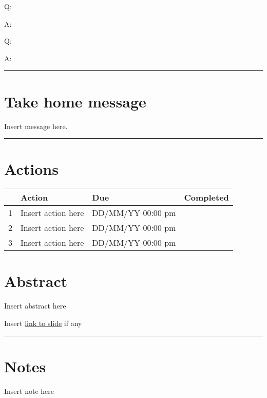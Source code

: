 \documentclass[
]{book}
\begin{document}
Q:

A:

Q:

A:

\begin{center}\rule{0.5\linewidth}{0.5pt}\end{center}

\hypertarget{take-home-message-30}{%
\section*{Take home message}\label{take-home-message-30}}

Insert message here.

\begin{center}\rule{0.5\linewidth}{0.5pt}\end{center}

\hypertarget{actions-30}{%
\section*{Actions}\label{actions-30}}

\begin{longtable}[]{@{}llll@{}}
\toprule
& Action & Due & Completed\tabularnewline
\midrule
\endhead
1 & Insert action here & DD/MM/YY 00:00 pm &\tabularnewline
2 & Insert action here & DD/MM/YY 00:00 pm &\tabularnewline
3 & Insert action here & DD/MM/YY 00:00 pm &\tabularnewline
\bottomrule
\end{longtable}

\hypertarget{abstract-31}{%
\section*{Abstract}\label{abstract-31}}

Insert abstract here

Insert \href{}{link to slide} if any

\begin{center}\rule{0.5\linewidth}{0.5pt}\end{center}

\hypertarget{notes-31}{%
\section*{Notes}\label{notes-31}}

Insert note here
\end{document}
